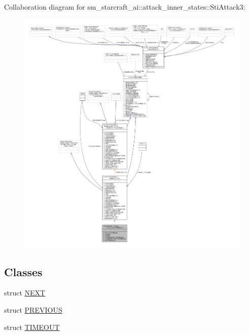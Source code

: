 Collaboration diagram for sm\+\_\+starcraft\+\_\+ai\+:\+:attack\+\_\+inner\+\_\+states\+:\+:Sti\+Attack3\+:
\nopagebreak
\begin{figure}[H]
\begin{center}
\leavevmode
\includegraphics[width=350pt]{structsm__starcraft__ai_1_1attack__inner__states_1_1StiAttack3__coll__graph}
\end{center}
\end{figure}
\subsection*{Classes}
\begin{DoxyCompactItemize}
\item 
struct \hyperlink{structsm__starcraft__ai_1_1attack__inner__states_1_1StiAttack3_1_1NEXT}{N\+E\+XT}
\item 
struct \hyperlink{structsm__starcraft__ai_1_1attack__inner__states_1_1StiAttack3_1_1PREVIOUS}{P\+R\+E\+V\+I\+O\+US}
\item 
struct \hyperlink{structsm__starcraft__ai_1_1attack__inner__states_1_1StiAttack3_1_1TIMEOUT}{T\+I\+M\+E\+O\+UT}
\end{DoxyCompactItemize}
